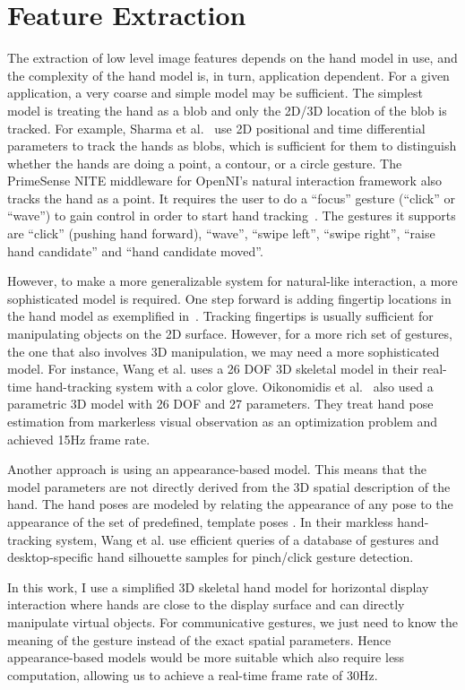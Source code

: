 \section{Feature Extraction}
The extraction of low level image features depends on the hand model in use, and
the complexity of the hand model is, in turn,  application dependent.
For a given application, a very coarse and simple model may be sufficient. The simplest model is treating the hand as a
blob and only the 2D/3D location of the blob is tracked. For example, Sharma et
al.~\cite{sharma00} use 2D positional and time differential parameters to track
the hands as blobs, which is sufficient for them to distinguish whether the
hands are doing a point, a contour, or a circle gesture. The PrimeSense NITE
middleware for OpenNI's natural interaction framework also tracks the hand as a
point. It requires the user to do a ``focus'' gesture (``click'' or ``wave'')
to gain control in order to start hand tracking~\cite{primesense-manual}. The
gestures it supports are ``click'' (pushing hand forward), ``wave'', ``swipe
left'', ``swipe right'', ``raise hand candidate'' and ``hand candidate moved''.

However, to make a more generalizable system for natural-like interaction, a
more sophisticated model is required. One step forward is adding fingertip
locations in the hand model as exemplified in~\cite{Oka02, harrison11,
larson11}.
Tracking fingertips is usually sufficient for manipulating objects on the 2D surface. However, for a more rich set of gestures, the one
that also involves 3D manipulation, we may need a more sophisticated
model. For instance, Wang et al. \cite{Wang09} uses a 26 DOF
3D skeletal model in their real-time hand-tracking system with a color glove.
Oikonomidis et al.~\cite{oikonomidis11} also used a parametric 3D model with 26
DOF and 27 parameters. They treat hand pose estimation from markerless visual
observation as an optimization problem and achieved 15Hz frame rate.

Another approach is using an appearance-based model. This means that the model
parameters are not directly derived from the 3D spatial description of the hand.
The hand poses are modeled by relating the appearance of any pose to the 
appearance of the set of predefined, template poses \cite{Pavlovic97}. In
their markless hand-tracking system, Wang et al. \cite{wang11} use efficient
queries of a database of gestures and desktop-specific hand silhouette samples
for pinch/click gesture detection.

In this work, I use a simplified 3D
skeletal hand model for horizontal display interaction where hands are close
to the display surface and can directly manipulate virtual objects.
For communicative gestures, we just need to know the meaning of the gesture instead
of the exact spatial parameters. Hence appearance-based models would be
more suitable which also require less computation, allowing us to achieve
a real-time frame rate of 30Hz.

